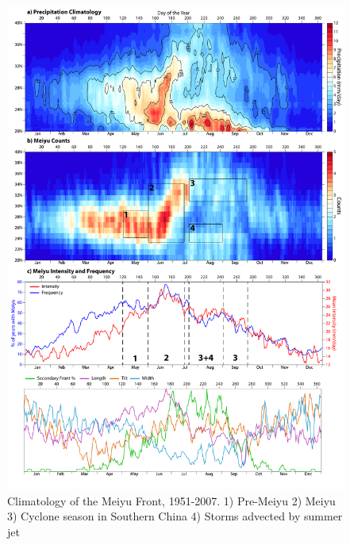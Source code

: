 \documentclass[draft,grl]{AGUTeX}
\begin{document}
\begin{figure}
\noindent\includegraphics[width=36pc]{fig1_dingchan.pdf}
\caption{Climatology of the Meiyu Front, 1951-2007. 1) Pre-Meiyu 2) Meiyu 3) Cyclone season in Southern China 4) Storms advected by summer jet}
\label{figure_label}
\end{figure}


\end{document}
